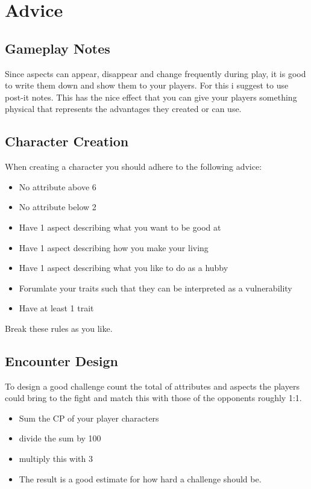 \documentclass[11pt]{article}
\begin{document}
{\newpage

\section{Advice}
\label{sec:orge249b49}
\subsection{Gameplay Notes}
\label{sec:org06a9e53}

Since aspects can appear, disappear and change frequently during play, it is good to write them down and show them to your players. For this i suggest to use post-it notes. This has the nice effect that you can give your players something physical that represents the advantages they created or can use.


\subsection{Character Creation}
\label{sec:org9ccd8d2}

When creating a character you should adhere to the following advice:
\begin{itemize}
\item No attribute above 6
\item No attribute below 2
\item Have 1 aspect describing what you want to be good at
\item Have 1 aspect describing how you make your living
\item Have 1 aspect describing what you like to do as a hubby
\item Forumlate your traits such that they can be interpreted as a vulnerability
\item Have at least 1 trait
\end{itemize}
Break these rules as you like.


\subsection{Encounter Design}
\label{sec:orga3fb67b}

To design a good challenge count the total of attributes and aspects the players could bring to the fight and match this with those of the opponents roughly 1:1.

\begin{itemize}
\item Sum the CP of your player characters
\item divide the sum by 100
\item multiply this with 3
\item The result is a good estimate for how hard a challenge should be.
\end{itemize}

}
\end{document}

